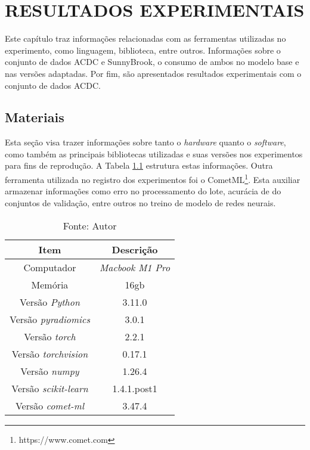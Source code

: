 \chapter{RESULTADOS EXPERIMENTAIS}
\label{chap:proposta_experimental}

Este capítulo traz informações relacionadas com as ferramentas utilizadas no experimento, como linguagem, biblioteca, entre outros. Informações sobre o conjunto de dados \gls{ACDC} e SunnyBrook, o consumo de ambos no modelo base e nas versões adaptadas. Por fim, são apresentados resultados experimentais com o conjunto de dados \gls{ACDC}. 

\section{Materiais} 
\label{sec:cap5_materiais}

Esta seção visa trazer informações sobre tanto o \textit{hardware} quanto o \textit{software}, como também as principais bibliotecas utilizadas e suas versões nos experimentos para fins de reprodução. A Tabela \ref{tab:hardware_software} estrutura estas informações. Outra ferramenta utilizada no registro dos experimentos foi o CometML\footnote{https://www.comet.com}. Esta auxiliar armazenar informações como erro no processamento do lote, acurácia de do conjuntos de validação, entre outros no treino de modelo de redes neurais.
\newline

\begin{table}[hbtp]
    \centering
    \renewcommand{\arraystretch}{1} %
    \begin{tabular}{|c|c|}
    \hline 
       \textbf{Item} & \textbf{Descrição}\\
    \hline 
       Computador & \textit{Macbook M1 Pro}  \\
    \hline 
       Memória & 16gb  \\
    \hline 
       Versão \textit{Python} & 3.11.0  \\
    \hline 
       Versão \textit{pyradiomics} & 3.0.1 \\
    \hline 
       Versão \textit{torch} & 2.2.1 \\
    \hline 
       Versão \textit{torchvision} & 0.17.1 \\
    \hline 
       Versão \textit{numpy} & 1.26.4 \\
    \hline 
       Versão \textit{scikit-learn} & 1.4.1.post1 \\
    \hline 
       Versão \textit{comet-ml} & 3.47.4 \\
    \hline 
    \end{tabular} 
    \caption{Fonte: Autor}
    \label{tab:hardware_software}
\end{table}

